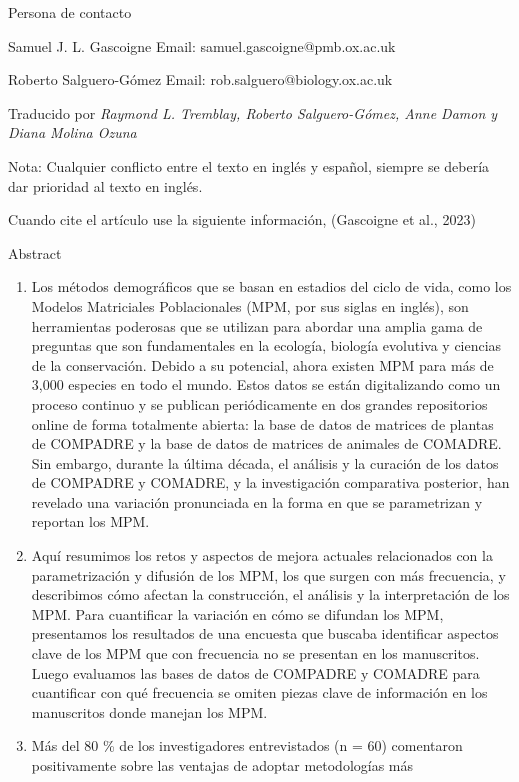 \documentclass[
  12pt,
  letterpaper,
]{book}
\begin{document}
Persona de contacto

Samuel J. L. Gascoigne Email: samuel.gascoigne@pmb.ox.ac.uk

Roberto Salguero-Gómez Email: rob.salguero@biology.ox.ac.uk

Traducido por \emph{Raymond L. Tremblay, Roberto Salguero-Gómez, Anne
Damon y Diana Molina Ozuna}

Nota: Cualquier conflicto entre el texto en inglés y español, siempre se
debería dar prioridad al texto en inglés.

Cuando cite el artículo use la siguiente información, (Gascoigne et al.,
2023)

Abstract

\begin{enumerate}
\def\labelenumi{\arabic{enumi}.}
\item
  Los métodos demográficos que se basan en estadios del ciclo de vida,
  como los Modelos Matriciales Poblacionales (MPM, por sus siglas en
  inglés), son herramientas poderosas que se utilizan para abordar una
  amplia gama de preguntas que son fundamentales en la ecología,
  biología evolutiva y ciencias de la conservación. Debido a su
  potencial, ahora existen MPM para más de 3,000 especies en todo el
  mundo. Estos datos se están digitalizando como un proceso continuo y
  se publican periódicamente en dos grandes repositorios online de forma
  totalmente abierta: la base de datos de matrices de plantas de
  COMPADRE y la base de datos de matrices de animales de COMADRE. Sin
  embargo, durante la última década, el análisis y la curación de los
  datos de COMPADRE y COMADRE, y la investigación comparativa posterior,
  han revelado una variación pronunciada en la forma en que se
  parametrizan y reportan los MPM.
\item
  Aquí resumimos los retos y aspectos de mejora actuales relacionados
  con la parametrización y difusión de los MPM, los que surgen con más
  frecuencia, y describimos cómo afectan la construcción, el análisis y
  la interpretación de los MPM. Para cuantificar la variación en cómo se
  difundan los MPM, presentamos los resultados de una encuesta que
  buscaba identificar aspectos clave de los MPM que con frecuencia no se
  presentan en los manuscritos. Luego evaluamos las bases de datos de
  COMPADRE y COMADRE para cuantificar con qué frecuencia se omiten
  piezas clave de información en los manuscritos donde manejan los MPM.
\item
  Más del 80 \% de los investigadores entrevistados (n = 60) comentaron
  positivamente sobre las ventajas de adoptar metodologías más

\end{enumerate}
\end{document}
